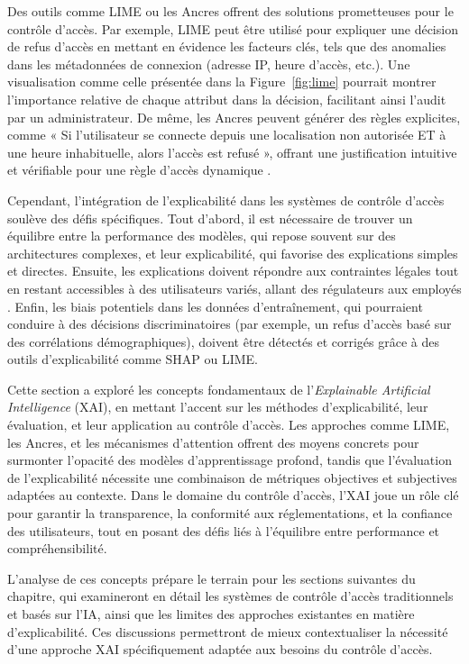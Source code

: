 Des outils comme LIME ou les Ancres offrent des solutions prometteuses pour le contrôle d’accès. Par exemple, LIME peut être utilisé pour expliquer une décision de refus d’accès en mettant en évidence les facteurs clés, tels que des anomalies dans les métadonnées de connexion (adresse IP, heure d’accès, etc.). Une visualisation comme celle présentée dans la Figure~\ref{fig:lime} pourrait montrer l’importance relative de chaque attribut dans la décision, facilitant ainsi l’audit par un administrateur. De même, les Ancres peuvent générer des règles explicites, comme « Si l’utilisateur se connecte depuis une localisation non autorisée ET à une heure inhabituelle, alors l’accès est refusé », offrant une justification intuitive et vérifiable pour une règle d’accès dynamique \cite{ribeiro2016lime}.


Cependant, l’intégration de l’explicabilité dans les systèmes de contrôle d’accès soulève des défis spécifiques. Tout d’abord, il est nécessaire de trouver un équilibre entre la performance des modèles, qui repose souvent sur des architectures complexes, et leur explicabilité, qui favorise des explications simples et directes. Ensuite, les explications doivent répondre aux contraintes légales tout en restant accessibles à des utilisateurs variés, allant des régulateurs aux employés \cite{desmoulin2019}. Enfin, les biais potentiels dans les données d’entraînement, qui pourraient conduire à des décisions discriminatoires (par exemple, un refus d’accès basé sur des corrélations démographiques), doivent être détectés et corrigés grâce à des outils d’explicabilité comme SHAP ou LIME.

Cette section a exploré les concepts fondamentaux de l’\textit{Explainable Artificial Intelligence} (XAI), en mettant l’accent sur les méthodes d’explicabilité, leur évaluation, et leur application au contrôle d’accès. Les approches comme LIME, les Ancres, et les mécanismes d’attention offrent des moyens concrets pour surmonter l’opacité des modèles d’apprentissage profond, tandis que l’évaluation de l’explicabilité nécessite une combinaison de métriques objectives et subjectives adaptées au contexte. Dans le domaine du contrôle d’accès, l’XAI joue un rôle clé pour garantir la transparence, la conformité aux réglementations, et la confiance des utilisateurs, tout en posant des défis liés à l’équilibre entre performance et compréhensibilité.

L’analyse de ces concepts prépare le terrain pour les sections suivantes du chapitre, qui examineront en détail les systèmes de contrôle d’accès traditionnels et basés sur l’IA, ainsi que les limites des approches existantes en matière d’explicabilité. Ces discussions permettront de mieux contextualiser la nécessité d’une approche XAI spécifiquement adaptée aux besoins du contrôle d’accès.
